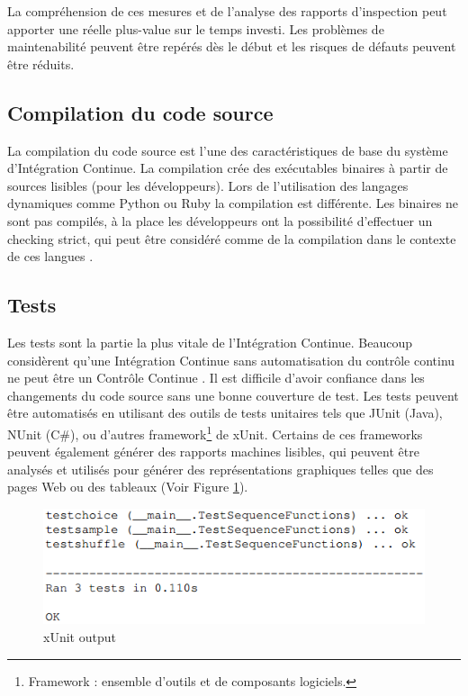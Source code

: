       La compréhension de ces mesures et de l'analyse des rapports d'inspection peut apporter une réelle plus-value sur le temps investi. Les problèmes de maintenabilité peuvent être repérés dès le début et les risques de défauts peuvent être réduits.

    \subsection{Compilation du code source}
    La compilation du code source est l'une des caractéristiques de base du système d’Intégration Continue. La compilation crée des exécutables binaires à partir de sources lisibles (pour les développeurs). Lors de l'utilisation des langages dynamiques comme Python ou Ruby la compilation est différente. Les binaires ne sont pas compilés, à la place les développeurs ont la possibilité d'effectuer un checking strict, qui peut être considéré comme de la compilation dans le contexte de ces langues \cite{Duv07}.

    \subsection{Tests}
    Les tests sont la partie la plus vitale de l’Intégration Continue. Beaucoup considèrent qu’une Intégration Continue sans automatisation du contrôle continu ne peut être un Contrôle Continue \cite{Duv07}. Il est difficile d'avoir confiance dans les changements du code source sans une bonne couverture de test. Les tests peuvent être automatisés en utilisant des outils de tests unitaires tels que JUnit (Java), NUnit (C\#), ou d'autres framework\footnote{Framework : ensemble d'outils et de composants logiciels.} de xUnit. Certains de ces frameworks peuvent également générer des rapports machines lisibles, qui peuvent être analysés et utilisés pour générer des représentations graphiques telles que des pages Web ou des tableaux (Voir Figure \ref{xUnit output}).

    \begin{figure}
      \begin{center}
        \includegraphics[scale=0.8]{images/tests.png}
      \end{center}
      \caption{xUnit output}
      \label{xUnit output}
    \end{figure}

